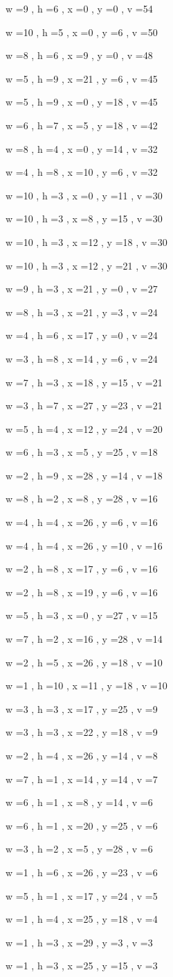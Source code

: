 \documentclass[11pt]{article}
\begin{document}
w =9 , h =6 , x =0 , y =0 , v =54
\par
w =10 , h =5 , x =0 , y =6 , v =50
\par
w =8 , h =6 , x =9 , y =0 , v =48
\par
w =5 , h =9 , x =21 , y =6 , v =45
\par
w =5 , h =9 , x =0 , y =18 , v =45
\par
w =6 , h =7 , x =5 , y =18 , v =42
\par
w =8 , h =4 , x =0 , y =14 , v =32
\par
w =4 , h =8 , x =10 , y =6 , v =32
\par
w =10 , h =3 , x =0 , y =11 , v =30
\par
w =10 , h =3 , x =8 , y =15 , v =30
\par
w =10 , h =3 , x =12 , y =18 , v =30
\par
w =10 , h =3 , x =12 , y =21 , v =30
\par
w =9 , h =3 , x =21 , y =0 , v =27
\par
w =8 , h =3 , x =21 , y =3 , v =24
\par
w =4 , h =6 , x =17 , y =0 , v =24
\par
w =3 , h =8 , x =14 , y =6 , v =24
\par
w =7 , h =3 , x =18 , y =15 , v =21
\par
w =3 , h =7 , x =27 , y =23 , v =21
\par
w =5 , h =4 , x =12 , y =24 , v =20
\par
w =6 , h =3 , x =5 , y =25 , v =18
\par
w =2 , h =9 , x =28 , y =14 , v =18
\par
w =8 , h =2 , x =8 , y =28 , v =16
\par
w =4 , h =4 , x =26 , y =6 , v =16
\par
w =4 , h =4 , x =26 , y =10 , v =16
\par
w =2 , h =8 , x =17 , y =6 , v =16
\par
w =2 , h =8 , x =19 , y =6 , v =16
\par
w =5 , h =3 , x =0 , y =27 , v =15
\par
w =7 , h =2 , x =16 , y =28 , v =14
\par
w =2 , h =5 , x =26 , y =18 , v =10
\par
w =1 , h =10 , x =11 , y =18 , v =10
\par
w =3 , h =3 , x =17 , y =25 , v =9
\par
w =3 , h =3 , x =22 , y =18 , v =9
\par
w =2 , h =4 , x =26 , y =14 , v =8
\par
w =7 , h =1 , x =14 , y =14 , v =7
\par
w =6 , h =1 , x =8 , y =14 , v =6
\par
w =6 , h =1 , x =20 , y =25 , v =6
\par
w =3 , h =2 , x =5 , y =28 , v =6
\par
w =1 , h =6 , x =26 , y =23 , v =6
\par
w =5 , h =1 , x =17 , y =24 , v =5
\par
w =1 , h =4 , x =25 , y =18 , v =4
\par
w =1 , h =3 , x =29 , y =3 , v =3
\par
w =1 , h =3 , x =25 , y =15 , v =3
\par
\newpage
\end{document}
